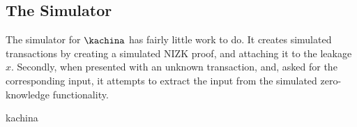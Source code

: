 \subsection{The Simulator}
\label{sec:simulator}

The simulator for $\kachina$ has fairly little work to do. It creates simulated
transactions by creating a simulated NIZK proof, and attaching it to the leakage
$x$. Secondly, when presented with an unknown transaction, and, asked for the
corresponding input, it attempts to extract the input from the simulated
zero-knowledge functionality.

{kachina}

